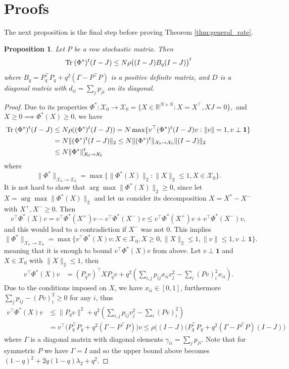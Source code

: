 \documentclass[a4paper,12pt]{article}
\def\tr{\mathrm{Tr}\hspace{0.8mm}}
\newtheorem{prop}{Proposition}
\begin{document}
\section{Proofs}
\label{sec:proofs}

The next proposition is the final step before proving Theorem \ref{thm:general_rate}.
\begin{prop}\label{prop:general_rate}
	Let $P$ be a row stochastic matrix. Then
	$$ \tr (\Phi^*)^t(I-J) \leq 
	N \rho\big((I-J)B_q(I-J) \big)^t
	$$ 
	where $B_q = P_q^\top P_q + q^2(\Gamma- P^\top P)$ is a positive definite matrix, and $D$ is a diagonal matrix with $d_{ii} = \sum_jp_{ji}$ on its diagonal.
\end{prop}
\begin{proof}
	Due to its properties $\Phi^* : \mathcal X_0 \to \mathcal X_0 = \{ X \in \mathbb R^{N\times N} : X=X^\top, XJ = 0 \},$ and \\ $X\geq 0 \implies \Phi^*(X) \geq 0$, we have
	\begin{align*} \tr (\Phi^*)^t(I-J) &\leq N \rho((\Phi^*)^t(I-J)) = N \max \{ v^\top (\Phi^*)^t(I-J) v : \|v\| = 1 , v\perp \mathbf 1\} \\
		& = N \| (\Phi^*)^t(I-J)\|_2 \leq N \|(\Phi^*)^t\|_{\mathcal X_0 \to \mathcal X_0} \|(I-J)\|_2 \\ &\leq N \|\Phi^*\|^t_{\mathcal X_0 \to \mathcal X_0}
	\end{align*}
	where 
	$$ \| \Phi^*\|_{\mathcal X_0\to \mathcal X_0} = \max \{ \|\Phi^*(X)\|_2 : \|X\|_2\leq 1, X \in \mathcal X_0\}. $$
	It is not hard to show that $\arg \max \|\Phi^*(X)\|_2 \geq 0$, since let $X = \arg\max \|\Phi^*(X)\|_2$ and let us consider its decomposition $X=X^* - X^-$ with $X^+, X^-\geq 0$. Then
	$$ v^\top \Phi^*(X) v = v^\top \Phi^*(X^+)v - v^\top \Phi^*(X^-)v \leq v^\top \Phi^*(X^+)v + v^\top \Phi^*(X^-) v ,$$
	and this would lead to a contradiction if $X^-$ was not $0$. This implies
	$$ \|\Phi^*\|_{\mathcal X_0 \to \mathcal X_0} = \max \{v^\top \Phi^*(X) v : X\in\mathcal X_0,X\geq 0, \|X\|_2\leq 1, \|v\|\leq 1, v \perp \mathbf 1\}. $$
	meaning that it is enough to bound $v^\top \Phi^*(X) v$ from above. Let $v \perp \mathbf 1$ and $X\in\mathcal X_0$ with $\|X\|_2 \leq 1$, then
	\begin{align*}
		v^\top \Phi^*(X) v &= (P_qv)^\top X P_qv + q^2(\sum_{i,j} p_{ij}x_{ii} v_j^2 - \sum_{i} (Pv)_i^2 x_{ii}).
	\end{align*}
	Due to the conditions imposed on $X$, we have $x_{ii} \in [0,1]$,  furthermore $ \sum_{j}p_{ij} - (Pv)_i^2 \geq 0 $ for any $i$, thus 
	\begin{align*} v^\top \Phi^*(X)v &\leq \|P_qv\|^2 + q^2(\sum_{i,j} p_{ij}v_j^2 - \sum_{i} (Pv)_i^2) \\
		& = v^\top \big(P_q^\top P_q + q^2(\Gamma - P^\top P)\big)v \leq \rho \bigg((I-J)(P^\top_qP_q + q^2(\Gamma-P^\top P)(I-J)\bigg)
	\end{align*} 
	where $\Gamma$ is a diagonal matrix with diagonal elements $\gamma_{ii}=\sum_jp_{ji}$. Note that for symmetric $P$ we have $\Gamma = I$ and so the upper bound above becomes $ (1-q)^2 + 2q(1-q)\lambda_2 + q^2.$
\end{proof}
\end{document}
